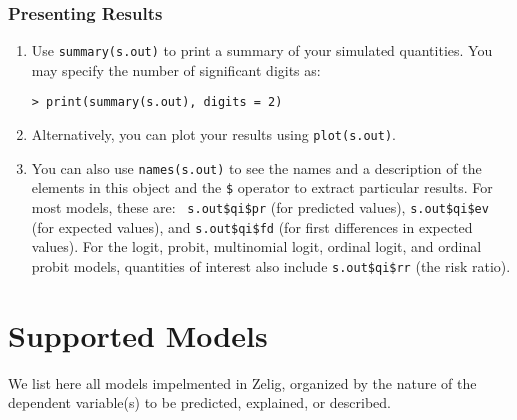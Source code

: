 \subsubsection*{Presenting Results}
\begin{enumerate}
\item Use {\tt summary(s.out)} to print a summary of your simulated
  quantities.  You may specify the number of significant digits as:
\begin{verbatim}
> print(summary(s.out), digits = 2)   
\end{verbatim}
\item Alternatively, you can plot your results using
  \texttt{plot(s.out)}.
\item You can also use \texttt{names(s.out)} to see the names and a
  description of the elements in this object and the {\tt \$} operator
  to extract particular results.  For most models, these are: {\tt
    s.out\$qi\$pr} (for predicted values), {\tt s.out\$qi\$ev} (for
  expected values), and {\tt s.out\$qi\$fd} (for first differences in
  expected values).  For the logit, probit, multinomial logit, ordinal
  logit, and ordinal probit models, quantities of interest also
  include {\tt s.out\$qi\$rr} (the risk ratio).
\end{enumerate} 

\section{Supported Models}\label{s:models}

We list here all models impelmented in Zelig, organized by the nature
of the dependent variable(s) to be predicted, explained, or described.

